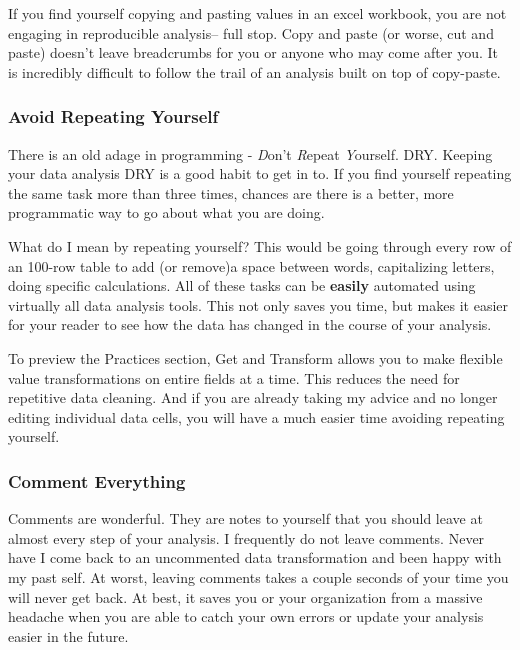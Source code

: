 \documentclass[
]{book}
\begin{document}
If you find yourself copying and pasting values in an excel workbook, you are not engaging in reproducible analysis-- full stop. Copy and paste (or worse, cut and paste) doesn't leave breadcrumbs for you or anyone who may come after you. It is incredibly difficult to follow the trail of an analysis built on top of copy-paste.

\hypertarget{avoid-repeating-yourself}{%
\subsubsection{Avoid Repeating Yourself}\label{avoid-repeating-yourself}}

There is an old adage in programming - \emph{D}on't \emph{R}epeat \emph{Y}ourself. DRY. Keeping your data analysis DRY is a good habit to get in to. If you find yourself repeating the same task more than three times, chances are there is a better, more programmatic way to go about what you are doing.

What do I mean by repeating yourself? This would be going through every row of an 100-row table to add (or remove)a space between words, capitalizing letters, doing specific calculations. All of these tasks can be \textbf{easily} automated using virtually all data analysis tools. This not only saves you time, but makes it easier for your reader to see how the data has changed in the course of your analysis.

To preview the Practices section, Get and Transform allows you to make flexible value transformations on entire fields at a time. This reduces the need for repetitive data cleaning. And if you are already taking my advice and no longer editing individual data cells, you will have a much easier time avoiding repeating yourself.

\hypertarget{comment-everything}{%
\subsubsection{Comment Everything}\label{comment-everything}}

Comments are wonderful. They are notes to yourself that you should leave at almost every step of your analysis. I frequently do not leave comments. Never have I come back to an uncommented data transformation and been happy with my past self. At worst, leaving comments takes a couple seconds of your time you will never get back. At best, it saves you or your organization from a massive headache when you are able to catch your own errors or update your analysis easier in the future.
\end{document}
